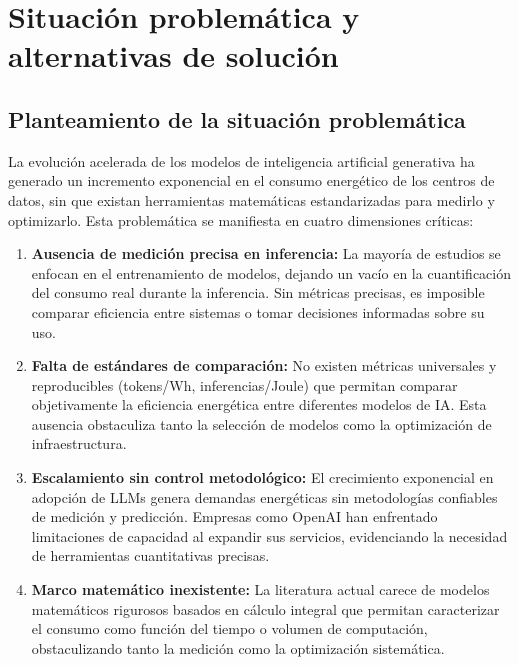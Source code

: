 \section{Situación problemática y alternativas de solución}

\subsection{Planteamiento de la situación problemática}

La evolución acelerada de los modelos de inteligencia artificial generativa ha generado un incremento exponencial en el consumo energético de los centros de datos, sin que existan herramientas matemáticas estandarizadas para medirlo y optimizarlo. Esta problemática se manifiesta en cuatro dimensiones críticas:

\begin{enumerate}
    \item \textbf{Ausencia de medición precisa en inferencia:} La mayoría de estudios se enfocan en el entrenamiento de modelos, dejando un vacío en la cuantificación del consumo real durante la inferencia. Sin métricas precisas, es imposible comparar eficiencia entre sistemas o tomar decisiones informadas sobre su uso.
    
    \item \textbf{Falta de estándares de comparación:} No existen métricas universales y reproducibles (tokens/Wh, inferencias/Joule) que permitan comparar objetivamente la eficiencia energética entre diferentes modelos de IA. Esta ausencia obstaculiza tanto la selección de modelos como la optimización de infraestructura.
    
    \item \textbf{Escalamiento sin control metodológico:} El crecimiento exponencial en adopción de LLMs genera demandas energéticas sin metodologías confiables de medición y predicción. Empresas como OpenAI han enfrentado limitaciones de capacidad al expandir sus servicios, evidenciando la necesidad de herramientas cuantitativas precisas.
    
    \item \textbf{Marco matemático inexistente:} La literatura actual carece de modelos matemáticos rigurosos basados en cálculo integral que permitan caracterizar el consumo como función del tiempo o volumen de computación, obstaculizando tanto la medición como la optimización sistemática.
\end{enumerate}

